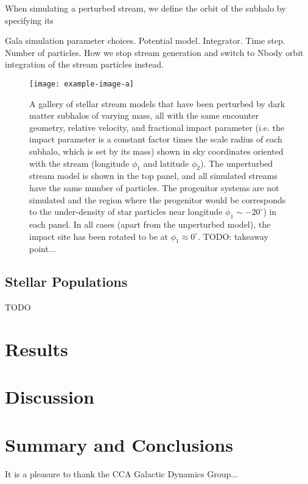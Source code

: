 When simulating a perturbed stream, we define the orbit of the subhalo by specifying its

Gala simulation parameter choices. Potential model. Integrator. Time step. Number of particles. How we stop stream generation and switch to Nbody orbit integration of the stream particles instead.

\begin{figure*}[!th]
\begin{center}
\texttt{[image: example-image-a]} %
\end{center}
\caption{%
A gallery of stellar stream models that have been perturbed by dark matter subhalos of
varying mass, all with the same encounter geometry, relative velocity, and fractional
impact parameter (i.e. the impact parameter is a constant factor times the scale radius
of each subhalo, which is set by its mass) shown in sky coordinates oriented with the
stream (longitude $\phi_1$ and latitude $\phi_2$).
The unperturbed stream model is shown in the top panel, and all simulated streams have
the same number of particles.
The progenitor systems are not simulated and the region where the progenitor would be
corresponds to the under-density of star particles near longitude $\phi_1 \sim
-20^\circ$) in each panel.
In all cases (apart from the unperturbed model), the impact site has been rotated to be
at $\phi_1 \approx 0^\circ$.
TODO: takeaway point...
\label{fig:simgallery}
}
\end{figure*}

\subsection{Stellar Populations} \label{sec:stellarpops}

TODO

\section{Results} \label{sec:results}


\section{Discussion} \label{sec:discussion}


\section{Summary and Conclusions} \label{sec:conclusions}


\begin{acknowledgements}

It is a pleasure to thank the CCA Galactic Dynamics Group...


\end{acknowledgements}






